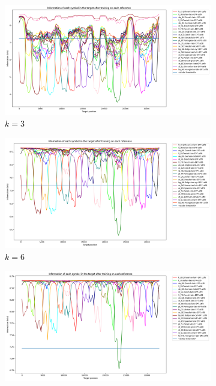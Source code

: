 \documentclass{article}
\begin{document}
\begin{figure}
    \begin{subfigure}[b]{0.3\textwidth}
        \begin{center}
            \includegraphics[width=1.0\linewidth]{../results/all_languages/-p_c:1:3.png}
        \end{center}
        \caption{$k = 3$}
        \label{fig:all_languages_p_c:1:3}
    \end{subfigure}
    \hfill
    \begin{subfigure}[b]{0.3\textwidth}
        \begin{center}
            \includegraphics[width=1.0\linewidth]{../results/all_languages/-p_c:1:6.png}
        \end{center}
        \caption{$k = 6$}
        \label{fig:all_languages_p_c:1:6}
    \end{subfigure}
    \hfill
    \begin{subfigure}[b]{0.3\textwidth}
        \begin{center}
            \includegraphics[width=1.0\linewidth]{../results/all_languages/-p_c:1:9.png}

\end{center}
\end{subfigure}
\end{figure}
\end{document}

